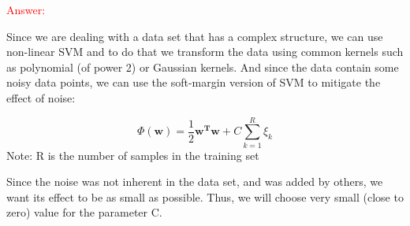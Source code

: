 \documentclass{homework}
\begin{document}
    \textcolor{red}{Answer:}
    
    Since we are dealing with a data set that has a complex structure, we can use non-linear SVM and to do that we transform the data using common kernels such as polynomial (of power 2) or Gaussian kernels. And since the data contain some noisy data points, we can use the soft-margin version of SVM to mitigate the effect of noise:
    
    \[ \Phi(\mathbf{w}) = \frac{1}{2}\mathbf{w^Tw} + C\sum_{k=1}^R \xi_k \]
    Note: R is the number of samples in the training set
    
    Since the noise was not inherent in the data set, and was added by others, we want its effect to be as small as possible. Thus, we will choose very small (close to zero) value for the parameter C.
    
    
    
    
    
    

    
    

 
        
     
  
\end{document}
